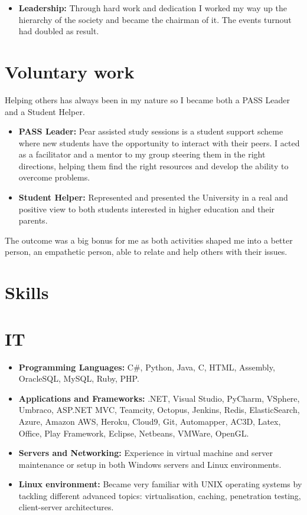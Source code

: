 \documentclass[12pt,a4paper]{res}
\begin{document}
\begin{resume}
\begin{itemize}
      \item {\bf Leadership:} Through hard work and dedication I worked my way up the hierarchy of the society and became the chairman of it. The events turnout had doubled as result.
     \end{itemize}

\section{\large\bf Voluntary work}
\vspace{2mm}
Helping others has always been in my nature so I became both a PASS Leader and a Student Helper.
      \begin{itemize}
      \item {\bf PASS Leader:} Pear assisted study sessions is a student support scheme where new students have the opportunity to interact with their peers. I acted as a facilitator and a mentor to my group steering them in the right directions, helping them find the right resources and develop the ability to overcome problems.
      \item {\bf Student Helper:} Represented and presented the University in a real
    and positive view to both students interested in higher education and their parents. 
      \end{itemize}
\vspace{-3mm}
    The outcome was a big bonus for me as both activities shaped me into a better person, an empathetic person, able to relate and
    help others with their issues.
    \vspace{-3mm}

\section{\large\bf Skills}
\vspace{2mm}
\section{IT}
\vspace{-1mm}
  \begin{itemize}

  \item[] {\bf Programming Languages:} C\#, Python, Java, C, HTML, Assembly, OracleSQL, MySQL, Ruby, PHP.
  \item[] {\bf Applications and Frameworks:} .NET, Visual Studio, PyCharm, VSphere, Umbraco, ASP.NET MVC, Teamcity, Octopus, Jenkins, Redis, ElasticSearch, Azure, Amazon AWS, Heroku, Cloud9, Git, Automapper, AC3D, Latex, Office, Play Framework, Eclipse, Netbeans, VMWare, OpenGL.
  \item[] {\bf Servers and Networking:} Experience in virtual machine and server maintenance or setup in both Windows servers and Linux environments.
  \item[] {\bf Linux environment:} Became very familiar with UNIX operating systems by tackling different advanced topics: virtualisation, caching, penetration testing, client-server architectures.


\end{itemize}
\end{resume}
\end{document}
